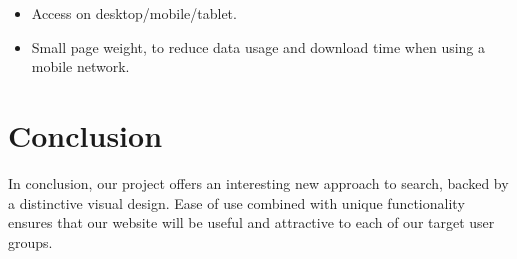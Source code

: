 \documentclass[10pt,a4paper]{article}
\begin{document}
\begin{itemize}
	\item Access on desktop/mobile/tablet.
	\item Small page weight, to reduce data usage and download time when using a mobile network.
\end{itemize}

\section*{Conclusion}

In conclusion, our project offers an interesting new approach to search, backed by a distinctive visual design. Ease of use combined with unique functionality ensures that our website will be useful and attractive to each of our target user groups.
\end{document}
